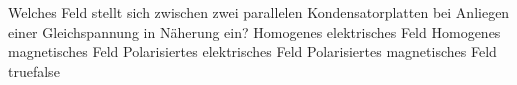     {Welches Feld stellt sich zwischen zwei parallelen Kondensatorplatten bei Anliegen einer Gleichspannung in Näherung ein?}
    {Homogenes elektrisches Feld}
    {Homogenes magnetisches Feld}
    {Polarisiertes elektrisches Feld}
    {Polarisiertes magnetisches Feld}
    {true}{false}